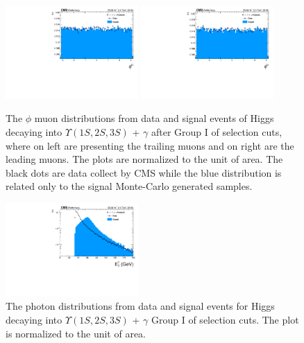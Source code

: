\begin{figure}[!htbp]
\begin{center}
\includegraphics[width=0.45\textwidth]{figures_and_tables/outputPlots/HtoUpsilon_Cat0_ZZZZZ/au/data_x_mc/noKinCuts/h_noKin_TrailingMu_phi}\hspace*{1.cm}
\includegraphics[width=0.45\textwidth]{figures_and_tables/outputPlots/HtoUpsilon_Cat0_ZZZZZ/au/data_x_mc/noKinCuts/h_noKin_LeadingMu_phi}
\end{center}\vspace*{-.5cm}
\caption{The $\phi$ muon distributions from data and signal events of Higgs decaying into $\Upsilon(1S,2S,3S)$ + $\gamma$ after Group I of selection cuts, where on left are presenting the trailing muons and on right are the leading muons. The plots are normalized to the unit of area. The black dots are data collect by CMS while the blue distribution is related only to the signal Monte-Carlo generated samples.}
\label{fig:phiMuons_HtoUpsilon_Cat0}
\end{figure}


\begin{figure}[!htbp]
\begin{center}
\includegraphics[width=0.45\textwidth]{figures_and_tables/outputPlots/HtoUpsilon_Cat0_ZZZZZ/au/data_x_mc/noKinCuts/h_noKin_Photon_pt}\hspace*{1.cm}
\end{center}\vspace*{-.5cm}
\caption{The \PT photon distributions from data and signal events for Higgs decaying into $\Upsilon(1S,2S,3S)$ + $\gamma$ Group I of selection cuts. The plot is normalized to the unit of area.}
\label{fig:pTPhoton_HtoUpsilon_Cat0}
\end{figure}


